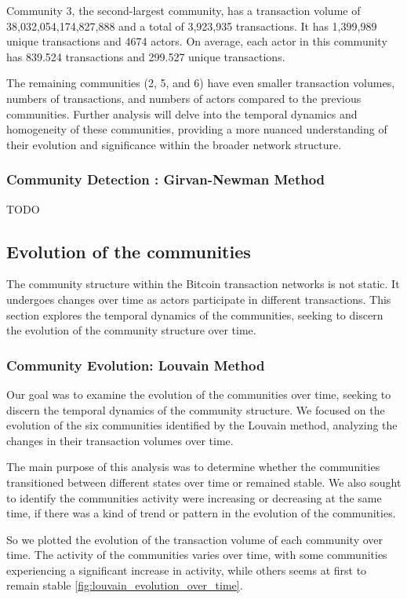 \documentclass[a4paper, 12pt]{article}
\begin{document}
Community 3, the second-largest community, has a transaction volume of 38,032,054,174,827,888 and a total of 3,923,935 transactions. It has 1,399,989 unique transactions and 4674 actors. On average, each actor in this community has 839.524 transactions and 299.527 unique transactions.

The remaining communities (2, 5, and 6) have even smaller transaction volumes, numbers of transactions, and numbers of actors compared to the previous communities.
Further analysis will delve into the temporal dynamics and homogeneity of these communities, providing a more nuanced understanding of their evolution and significance within the broader network structure.


\subsubsection{Community Detection : Girvan-Newman Method}
TODO

\subsection{Evolution of the communities}
The community structure within the Bitcoin transaction networks is not static. It undergoes changes over time as actors participate in different transactions.
This section explores the temporal dynamics of the communities, seeking to discern the evolution of the community structure over time.

\subsubsection{Community Evolution: Louvain Method}

Our goal was to examine the evolution of the communities over time, seeking to discern the temporal dynamics of the community structure. 
We focused on the evolution of the six communities identified by the Louvain method, analyzing the changes in their transaction volumes over time.

The main purpose of this analysis was to determine whether the communities transitioned between different states over time or remained stable. 
We also sought to identify the communities activity were increasing or decreasing at the same time, if there was a kind of trend or pattern in the evolution of the communities.

So we plotted the evolution of the transaction volume of each community over time.
The activity of the communities varies over time, with some communities experiencing a significant increase in activity, while others seems at first to remain stable \ref{fig:louvain_evolution_over_time}. 
\end{document}
